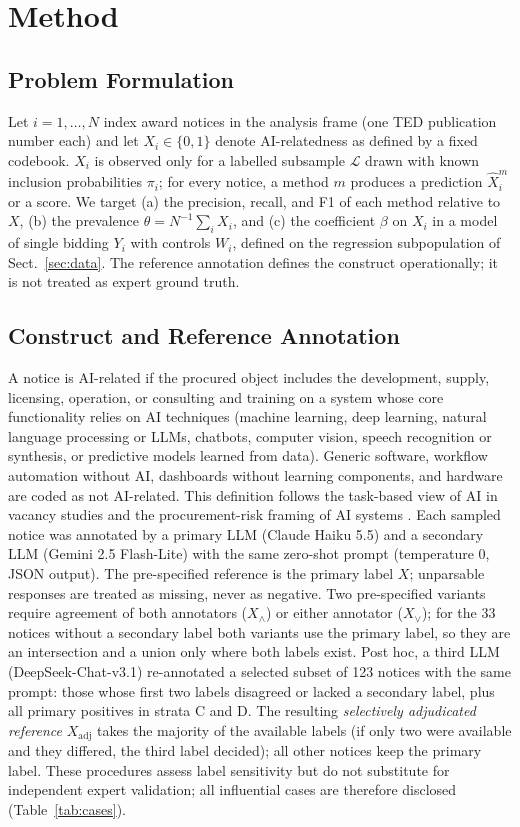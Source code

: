 \documentclass[runningheads]{llncs}
\begin{document}
\section{Method}
\subsection{Problem Formulation}
Let $i=1,\dots,N$ index award notices in the analysis frame (one TED publication number each) and let $X_i\in\{0,1\}$ denote AI-relatedness as defined by a fixed codebook. $X_i$ is observed only for a labelled subsample $\mathcal{L}$ drawn with known inclusion probabilities $\pi_i$; for every notice, a method $m$ produces a prediction $\hat{X}^m_i$ or a score. We target (a) the precision, recall, and F1 of each method relative to $X$, (b) the prevalence $\theta=N^{-1}\sum_i X_i$, and (c) the coefficient $\beta$ on $X_i$ in a model of single bidding $Y_i$ with controls $W_i$, defined on the regression subpopulation of Sect.~\ref{sec:data}. The reference annotation defines the construct operationally; it is not treated as expert ground truth.

\subsection{Construct and Reference Annotation}
A notice is AI-related if the procured object includes the development, supply, licensing, operation, or consulting and training on a system whose core functionality relies on AI techniques (machine learning, deep learning, natural language processing or LLMs, chatbots, computer vision, speech recognition or synthesis, or predictive models learned from data). Generic software, workflow automation without AI, dashboards without learning components, and hardware are coded as not AI-related. This definition follows the task-based view of AI in vacancy studies \cite{acemoglu2022} and the procurement-risk framing of AI systems \cite{hickok2022}. Each sampled notice was annotated by a primary LLM (Claude Haiku 5.5) and a secondary LLM (Gemini 2.5 Flash-Lite) with the same zero-shot prompt (temperature 0, JSON output). The pre-specified reference is the primary label $X$; unparsable responses are treated as missing, never as negative. Two pre-specified variants require agreement of both annotators ($X_\wedge$) or either annotator ($X_\vee$); for the 33 notices without a secondary label both variants use the primary label, so they are an intersection and a union only where both labels exist. Post hoc, a third LLM (DeepSeek-Chat-v3.1) re-annotated a selected subset of 123 notices with the same prompt: those whose first two labels disagreed or lacked a secondary label, plus all primary positives in strata C and D. The resulting \emph{selectively adjudicated reference} $X_{\mathrm{adj}}$ takes the majority of the available labels (if only two were available and they differed, the third label decided); all other notices keep the primary label. These procedures assess label sensitivity but do not substitute for independent expert validation; all influential cases are therefore disclosed (Table~\ref{tab:cases}).
\end{document}
